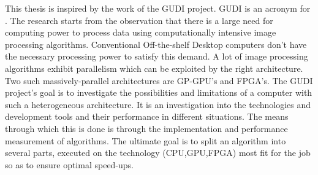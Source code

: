 This thesis is inspired by the work of the GUDI project. GUDI is an acronym for . The research starts from the observation that there is a large need for computing power to process data using computationally intensive image processing algorithms. Conventional Off-the-shelf Desktop computers don't have the necessary processing power to satisfy this demand. A lot of image processing algorithms exhibit parallelism which can be exploited by the right architecture. Two such massively-parallel architectures are GP-GPU's and FPGA's. The GUDI project's goal is to investigate the possibilities and limitations of a computer with such a heterogeneous architecture. It is an investigation into the technologies and development tools and their performance in different situations. The means through which this is done is through the implementation and performance measurement of algorithms. The ultimate goal is to split an algorithm into several parts, executed on the technology (CPU,GPU,FPGA) most fit for the job so as to ensure optimal speed-ups.






